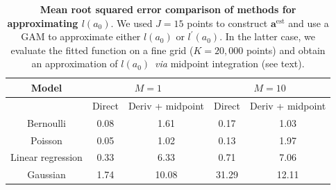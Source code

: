 \documentclass[a4paper, notitlepage, 11pt]{article}
\begin{document}
\begin{table}[!ht]
\caption{\textbf{ Mean root squared error comparison of methods for approximating $l(a_0)$}.
We used $J = 15$ points to construct $\boldsymbol a^{\text{est}}$ and use a GAM to approximate either $l(a_0)$ or $l^\prime(a_0)$. 
In the latter case, we evaluate the fitted function on a fine grid ($K = 20, 000$ points) and obtain an approximation of $l(a_0)$~\textit{via} midpoint integration (see text).
}
\begin{center}
\label{tab:rmse_approx}
\begin{tabular}{ccccc}
\hline
        Model          & \multicolumn{2}{c}{$M = 1$} & \multicolumn{2}{c}{$M = 10$} \\
\hline
                  & Direct & Deriv + midpoint & Direct  & Deriv + midpoint \\
Bernoulli         & 0.08   & 1.61             & 0.17    & 1.03             \\
Poisson           & 0.05   & 1.02             & 0.13    & 1.97             \\
Linear regression & 0.33   & 6.33             & 0.71    & 7.06             \\
Gaussian          & 1.74   & 10.08            & 31.29   & 12.11           \\
\hline
\end{tabular} 
\end{center}
\end{table}

% 
\end{document}
